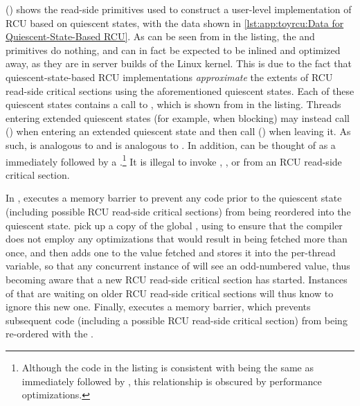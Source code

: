 \begin{lineref}
()
shows the read-side primitives used to construct a user-level
implementation of RCU based on quiescent states, with the data shown in
\cref{lst:app:toyrcu:Data for Quiescent-State-Based RCU}.
As can be seen from  in the listing,
the 
and  primitives do nothing, and can in fact
be expected to be inlined and optimized away, as they are in
server builds of the Linux kernel.
This is due to the fact that quiescent-state-based RCU implementations
\emph{approximate} the extents of RCU read-side critical sections
using the aforementioned quiescent states.
Each of these quiescent states contains a call to
, which is shown from
 in the listing.
Threads entering extended quiescent states (for example, when blocking)
may instead call 
() when entering
an extended quiescent state and then call
() when leaving it.
As such,  is analogous to 
and  is analogous to .
In addition,  can be thought of as a
 immediately followed by a
.\footnote{
	Although the code in the listing is consistent with
	being the same as  immediately followed by
	, this relationship is obscured by
	performance optimizations.}
It is illegal to invoke , ,
or  from an RCU read-side critical section.
\end{lineref}

\begin{lineref}
In ,  executes a memory barrier
to prevent any code prior to the quiescent state (including possible
RCU read-side critical sections) from being reordered
into the quiescent state.
 pick up
a copy of the global , using
 to ensure that the compiler does not employ any
optimizations that would result in  being fetched
more than once,
and then adds one to the value fetched and stores it into
the per-thread  variable, so that any concurrent
instance of  will see an odd-numbered value,
thus becoming aware that a new RCU read-side critical section has started.
Instances of  that are waiting on older
RCU read-side critical sections will thus know to ignore this new one.
Finally,  executes a memory barrier, which prevents subsequent
code (including a possible RCU read-side critical section) from being
re-ordered with the .
\end{lineref}

